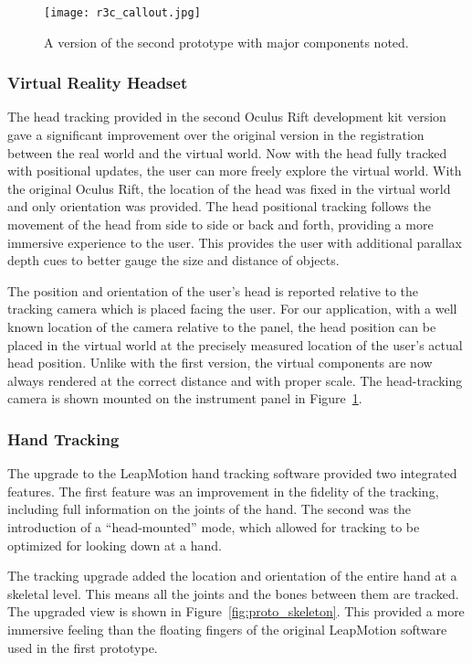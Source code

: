\begin{figure}
    \centering
    \texttt{[image: r3c\_callout.jpg]}
    \caption{A version of the second prototype with major components noted.}
    \label{fig:r3c_callout}
\end{figure}

\subsubsection{Virtual Reality Headset}

The head tracking provided in the second Oculus Rift development kit version gave a significant improvement over the original version in the registration between the real world and the virtual world.
Now with the head fully tracked with positional updates, the user can more freely explore the virtual world.
With the original Oculus Rift, the location of the head was fixed in the virtual world and only orientation was provided.
The head positional tracking follows the movement of the head from side to side or back and forth, providing a more immersive experience to the user.
This provides the user with additional parallax depth cues to better gauge the size and distance of objects.

The position and orientation of the user's head is reported relative to the tracking camera which is placed facing the user.
For our application, with a well known location of the camera relative to the panel, the head position can be placed in the virtual world at the precisely measured location of the user's actual head position.
Unlike with the first version, the virtual components are now always rendered at the correct distance and with proper scale.
The head-tracking camera is shown mounted on the instrument panel in Figure~\ref{fig:r3c_callout}.


\subsubsection{Hand Tracking}
\label{sec:proto-hand-tracking}

The upgrade to the LeapMotion hand tracking software provided two integrated features.
The first feature was an improvement in the fidelity of the tracking, including full information on the joints of the hand.
The second was the introduction of a ``head-mounted'' mode, which allowed for tracking to be optimized for looking down at a hand.

The tracking upgrade added the location and orientation of the entire hand at a skeletal level.
This means all the joints and the bones between them are tracked.
The upgraded view is shown in Figure~\ref{fig:proto_skeleton}.
This provided a more immersive feeling than the floating fingers of the original LeapMotion software used in the first prototype.

